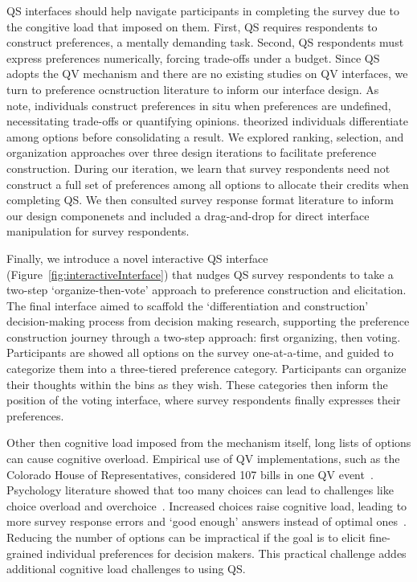QS interfaces should help navigate participants in completing the survey due to the congitive load that imposed on them. First, QS requires respondents to construct preferences, a mentally demanding task. Second, QS respondents must express preferences numerically, forcing trade-offs under a budget. 
Since QS adopts the QV mechanism and there are no existing studies on QV interfaces, we turn to preference ocnstruction literature to inform our interface design. As~\textcite{lichtensteinConstructionPreference2006} note, individuals construct preferences in situ when preferences are undefined, necessitating trade-offs or quantifying opinions. \textcite{svensonDifferentiationConsolidationTheory1992} theorized individuals differentiate among options before consolidating a result. We explored ranking, selection, and organization approaches over three design iterations to facilitate preference construction. During our iteration, we learn that survey respondents need not construct a full set of preferences among all options to allocate their credits when completing QS. We then consulted survey response format literature\cite{toepoelSlidersVisualAnalogue2018} to inform our design componenets and included a drag-and-drop for direct interface manipulation for survey respondents.  

Finally, we introduce a novel interactive QS interface (Figure~\ref{fig:interactiveInterface}) that nudges QS survey respondents to take a two-step `organize-then-vote' approach to preference construction and elicitation. The final interface aimed to scaffold the `differentiation and construction' decision-making process from decision making research, supporting the preference construction journey through a two-step approach: first organizing, then voting. Participants are showed all options on the survey one-at-a-time, and guided to categorize them into a three-tiered preference category. Participants can organize their thoughts within the bins as they wish. These categories then inform the position of the voting interface, where survey respondents finally expresses their preferences.

Other then cognitive load imposed from the mechanism itself, long lists of options can cause cognitive overload. Empirical use of QV implementations, such as the Colorado House of Representatives, considered 107 bills in one QV event~\cite{QuadraticVotingColorado}. Psychology literature showed that too many choices can lead to challenges like choice overload and overchoice~\cite{iyengarWhenChoiceDemotivating2000, gourvilleOverchoiceAssortmentType2005}. Increased choices raise cognitive load, leading to more survey response errors and `good enough' answers instead of optimal ones~\cite{lenznerCognitiveBurdenSurvey2010, blessAskingDifficultQuestions1992}. Reducing the number of options can be impractical if the goal is to elicit fine-grained individual preferences for decision makers. This practical challenge addes additional cognitive load challenges to using QS.

